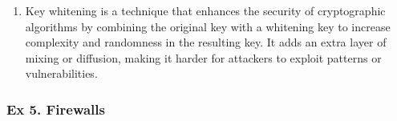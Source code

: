 {\begin{enumerate}
		This attack demonstrates a clever method to reduce the computational effort required to find the correct key pair in a double encryption scheme, making it a valuable technique for cryptanalysis in certain scenarios. 
		
		\item Key whitening is a technique that enhances the security of cryptographic algorithms by combining the original key with a whitening key to increase complexity and randomness in the resulting key. It adds an extra layer of mixing or diffusion, making it harder for attackers to exploit patterns or vulnerabilities.
	\end{enumerate}}
	
	\subsubsection{Ex 5. Firewalls}	

